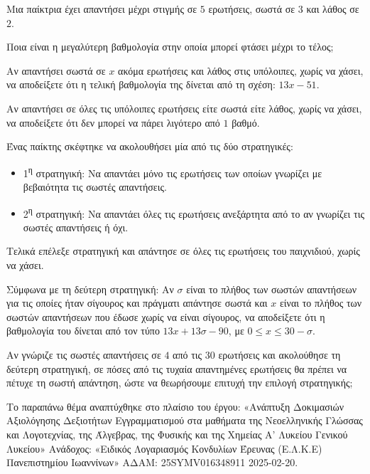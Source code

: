 \begin{alist}
\item Μια παίκτρια έχει απαντήσει μέχρι στιγμής σε $5$ ερωτήσεις, σωστά σε $3$ και λάθος σε $2$.

\begin{rlist}
\item Ποια είναι η μεγαλύτερη βαθμολογία στην οποία μπορεί φτάσει μέχρι το τέλος;
\item Αν απαντήσει σωστά σε $x$ ακόμα ερωτήσεις και λάθος στις υπόλοιπες, χωρίς να χάσει, να αποδείξετε ότι η τελική βαθμολογία της δίνεται από τη σχέση: $13x - 51$.
\item Αν απαντήσει σε όλες τις υπόλοιπες ερωτήσεις είτε σωστά είτε λάθος, χωρίς να χάσει, να αποδείξετε ότι δεν μπορεί να πάρει λιγότερο από $1$ βαθμό.
\end{rlist}
\item Ένας παίκτης σκέφτηκε να ακολουθήσει μία από τις δύο στρατηγικές:

\begin{itemize}
\item
  1\textsuperscript{η} στρατηγική: Να απαντάει μόνο τις ερωτήσεις των οποίων γνωρίζει με βεβαιότητα τις σωστές απαντήσεις.
\item
  2\textsuperscript{η} στρατηγική: Να απαντάει όλες τις ερωτήσεις ανεξάρτητα από το αν γνωρίζει τις σωστές απαντήσεις ή όχι.
\end{itemize}

Τελικά επέλεξε στρατηγική και απάντησε σε όλες τις ερωτήσεις του παιχνιδιού, χωρίς να χάσει.

\begin{rlist}
\item Σύμφωνα με τη δεύτερη στρατηγική: Αν $\sigma$ είναι το πλήθος των σωστών απαντήσεων για τις οποίες ήταν σίγουρος και πράγματι απάντησε σωστά και $x$ είναι το πλήθος των σωστών απαντήσεων που έδωσε χωρίς να είναι σίγουρος, να αποδείξετε ότι η βαθμολογία του δίνεται από τον τύπο $13x + 13\sigma - 90$, με $0 \leq x \leq 30 - \sigma$.
\item Αν γνώριζε τις σωστές απαντήσεις σε $4$ από τις $30$ ερωτήσεις και ακολούθησε τη δεύτερη στρατηγική, σε πόσες από τις τυχαία απαντημένες ερωτήσεις θα πρέπει να πέτυχε τη σωστή απάντηση, ώστε να θεωρήσουμε επιτυχή την επιλογή στρατηγικής;

{\footnotesize Το παραπάνω θέμα αναπτύχθηκε στο πλαίσιο του έργου: «Ανάπτυξη Δοκιμασιών Αξιολόγησης Δεξιοτήτων Εγγραμματισμού στα μαθήματα της Νεοελληνικής Γλώσσας και Λογοτεχνίας, της Άλγεβρας, της Φυσικής και της Χημείας Α' Λυκείου Γενικού Λυκείου» Ανάδοχος: «Ειδικός Λογαριασμός Κονδυλίων Έρευνας (Ε.Λ.Κ.Ε) Πανεπιστημίου Ιωαννίνων» ΑΔΑΜ: 25SYMV016348911 2025-02-20.}
\end{rlist}
\end{alist}

